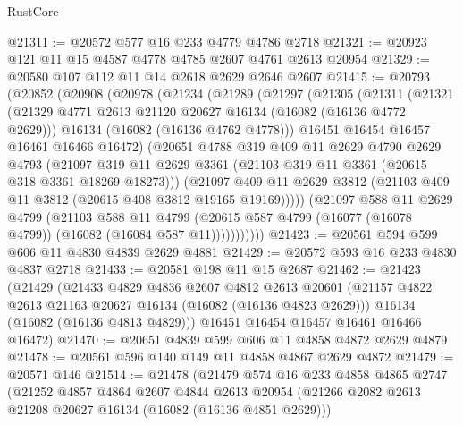 \begin{lexlean}{RustCore}
\begin{coremodule}
@21311 := @20572 @577 @16 @233 @4779 @4786 @2718
@21321 := @20923 @121 @11 @15 @4587 @4778 @4785 @2607 @4761 @2613 @20954
@21329 := @20580 @107 @112 @11 @14 @2618 @2629 @2646 @2607
@21415 := @20793
    (@20852
      (@20908
        (@20978
          (@21234
            (@21289
              (@21297
                (@21305
                  (@21311
                    (@21321
                      (@21329 @4771 @2613 @21120 @20627 @16134 (@16082 (@16136 @4772 @2629)))
                      @16134
                      (@16082 (@16136 @4762 @4778)))
                    @16451
                    @16454
                    @16457
                    @16461
                    @16466
                    @16472)
                  (@20651
                    @4788
                    @319
                    @409
                    @11
                    @2629
                    @4790
                    @2629
                    @4793
                    (@21097
                      @319
                      @11
                      @2629
                      @3361
                      (@21103 @319 @11 @3361 (@20615 @318 @3361 @18269 @18273)))
                    (@21097
                      @409
                      @11
                      @2629
                      @3812
                      (@21103 @409 @11 @3812 (@20615 @408 @3812 @19165 @19169)))))
                (@21097
                  @588
                  @11
                  @2629
                  @4799
                  (@21103
                    @588
                    @11
                    @4799
                    (@20615 @587 @4799 (@16077 (@16078 @4799)) (@16082 (@16084 @587 @11)))))))))))
@21423 := @20561 @594 @599 @606 @11 @4830 @4839 @2629 @4881
@21429 := @20572 @593 @16 @233 @4830 @4837 @2718
@21433 := @20581 @198 @11 @15 @2687
@21462 := @21423
    (@21429
      (@21433
        @4829
        @4836
        @2607
        @4812
        @2613
        @20601
        (@21157 @4822 @2613 @21163 @20627 @16134 (@16082 (@16136 @4823 @2629)))
        @16134
        (@16082 (@16136 @4813 @4829)))
      @16451
      @16454
      @16457
      @16461
      @16466
      @16472)
@21470 := @20651 @4839 @599 @606 @11 @4858 @4872 @2629 @4879
@21478 := @20561 @596 @140 @149 @11 @4858 @4867 @2629 @4872
@21479 := @20571 @146
@21514 := @21478
    (@21479
      @574
      @16
      @233
      @4858
      @4865
      @2747
      (@21252
        @4857
        @4864
        @2607
        @4844
        @2613
        @20954
        (@21266 @2082 @2613 @21208 @20627 @16134 (@16082 (@16136 @4851 @2629)))

\end{coremodule}
\end{lexlean}
